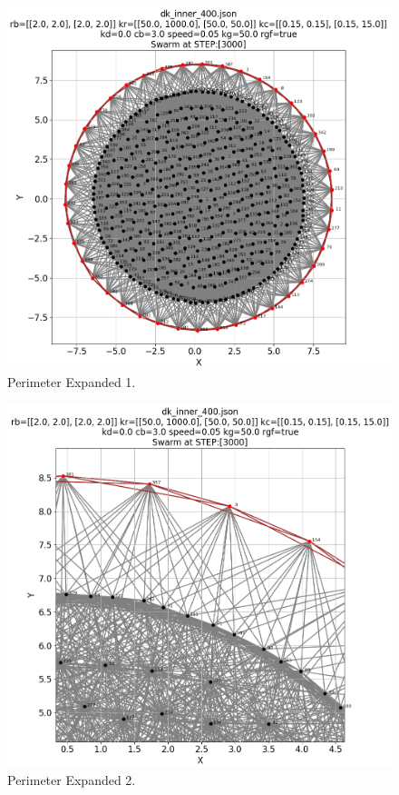 \documentclass[12pt,a4paper]{IEEEtran}
\begin{document}
\begin{figure}[H]
	\begin{center}
		\includegraphics[width=1.0\linewidth]{figures/inner1}
	\end{center}
	\caption{Perimeter Expanded 1. \label{fig:perimExpand1}}
\end{figure}

\begin{figure}[H]
	\begin{center}
		\includegraphics[width=1.0\linewidth]{figures/inner2}
	\end{center}
	\caption{Perimeter Expanded 2. \label{fig:perimExpand2}}
\end{figure}
\end{document}
